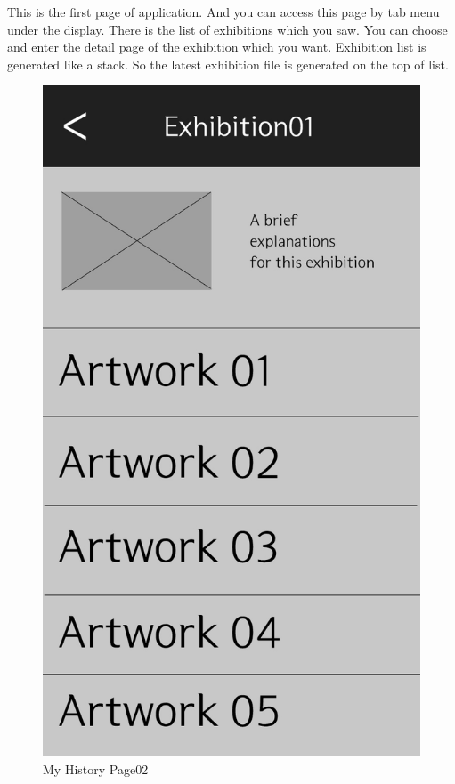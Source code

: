 \documentclass[conference]{IEEEtran}
\begin{document}
This is the first page of application. And you can access this page by tab menu under the display. There is the list of exhibitions which you saw. You can choose and enter the detail page of  the exhibition which you want. Exhibition list is generated like a stack. So the latest exhibition file is generated on the top of list. \\

\begin{figure}[htbp]
\begin{center}
    \includegraphics[scale=0.15]{img_exhiDetail01}
    \caption{My History Page02} 
\end{center}
\end{figure}
\end{document}
